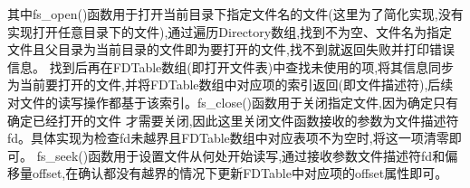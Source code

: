 其中fs\_open()函数用于打开当前目录下指定文件名的文件(这里为了简化实现,没有实现打开任意目录下的文件),通过遍历Directory数组,找到不为空、文件名为指定文件且父目录为当前目录的文件即为要打开的文件,找不到就返回失败并打印错误信息。
找到后再在FDTable数组(即打开文件表)中查找未使用的项,将其信息同步为当前要打开的文件,并将FDTable数组中对应项的索引返回(即文件描述符),后续对文件的读写操作都基于该索引。fs\_close()函数用于关闭指定文件,因为确定只有确定已经打开的文件
才需要关闭,因此这里关闭文件函数接收的参数为文件描述符fd。具体实现为检查fd未越界且FDTable数组中对应表项不为空时,将这一项清零即可。
fs\_seek()函数用于设置文件从何处开始读写,通过接收参数文件描述符fd和偏移量offset,在确认都没有越界的情况下更新FDTable中对应项的offset属性即可。
